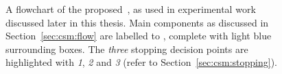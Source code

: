 \begin{figure}[t!]
    \centering
    \caption[Flowchart of the~\gls{acr:csm}]{A flowchart of the proposed~, as used in experimental work discussed later in this thesis. Main components as discussed in Section~\ref{sec:csm:flow} are labelled  to , complete with light blue surrounding boxes. The \emph{three} stopping decision points are highlighted with \emph{1}, \emph{2} and \emph{3} (refer to Section~\ref{sec:csm:stopping}).}
    \label{fig:csm}
\end{figure}

